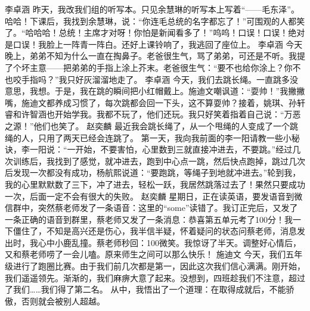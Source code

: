 \markdownRendererInterblockSeparator
{}\markdownRendererInterblockSeparator
{}李卓涵\markdownRendererInterblockSeparator
{}昨天，我改我们组的听写本。只见余慧琳的听写本上写着“——毛东泽”。哈哈！下课后，我找到余慧琳，说：“你连毛总统的名字都忘了！”可围观的人都笑了。“哈哈哈！总统！主席才对呀！你怕是新闻看多了！”呜呜！口误！口误！绝对是口误！我脸上一阵青一阵白。还好上课铃响了，我逃回了座位上。\markdownRendererInterblockSeparator
{}\markdownRendererInterblockSeparator
{}李卓涵\markdownRendererInterblockSeparator
{}今天晚上，弟弟不知为什么一直在掏鼻子。老爸很生气，骂了弟弟，可还是不听。我提了个坏主意——把弟弟的手指上涂上芥末。老爸很生气：“要不也给你涂上？你不也咬手指吗？”我只好灰溜溜地走了。\markdownRendererInterblockSeparator
{}\markdownRendererInterblockSeparator
{}李卓涵\markdownRendererInterblockSeparator
{}今天，我们去跳长绳。一直跳多没意思，我想。于是，我在跳的瞬间把小红帽戴上。施迪文嘲讽道：“耍帅！”我撇撇嘴，施迪文都养成习惯了，每次跳都会回一下头，这不算耍帅？接着，姚琪、孙轩睿和许智涵也开始学我。我都不玩了，他们还玩。我只好笑着指着自己说：“万恶之源！”他们也笑了。\markdownRendererInterblockSeparator
{}\markdownRendererInterblockSeparator
{}赵奕麟\markdownRendererInterblockSeparator
{}最近我会跳长绳了，从一个甩绳的人变成了一个跳绳的人，只用了两天已经会连跳了。 第一天，我向我前面的李一阳请教一些小秘诀，李一阳说：“一开始，不要害怕，心里数到三就直接冲进去，不要跳。”经过几次训练后，我找到了感觉，就冲进去，跑到中心点一跳，然后快点跑掉，跳过几次后发现一次都没有成功，杨航熙说道：“要跑跳，等绳子到地就冲进去。”轮到我，我的心里默默数了三下，冲了进去，轻松一跃，我居然跳落过去了！果然只要成功一次，后面一定不会有很大的失败。\markdownRendererInterblockSeparator
{}\markdownRendererInterblockSeparator
{}赵奕麟\markdownRendererInterblockSeparator
{}星期日，正在读英语，要发语音到微信群中，突然蔡老师发了一条语音：这里的“some”读错了。我订正完后，又发了一条正确的语音到群里，蔡老师又发了一条消息：恭喜第五单元考了100分！我一下僵住了，不知是高兴还是伤心，我半信半疑，怀着疑问的状态问蔡老师，消息发出时，我心中小鹿乱撞。蔡老师秒回：100微笑。我惊讶了半天。调整好心情后，又和蔡老师唠了一会儿嗑。原来师生之间可以那么快乐！\markdownRendererInterblockSeparator
{}\markdownRendererInterblockSeparator
{}施迪文\markdownRendererInterblockSeparator
{}今天，我们五年级进行了跑圈比赛。由于我们前几次都是第一，因此这次我们信心满满。刚开始，我们遥遥领先。渐渐的，我们麻痹大意了起来。没想到，四班趁我们不注意，超过了我们……我们得了第二名。 从中，我悟出了一个道理：在取得成就后，不能骄傲，否则就会被别人超越。\markdownRendererInterblockSeparator
